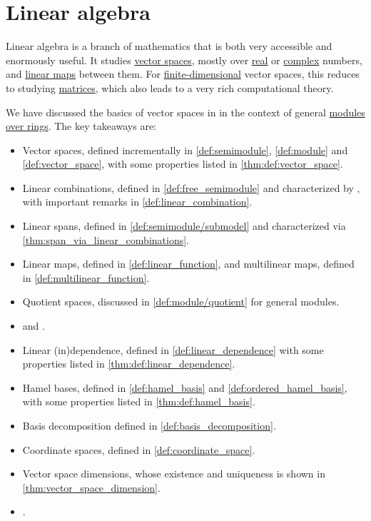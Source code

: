 \chapter{Linear algebra}\label{ch:linear_algebra}

Linear algebra is a branch of mathematics that is both very accessible and enormously useful. It studies \hyperref[def:vector_space]{vector spaces}, mostly over \hyperref[def:real_numbers]{real} or \hyperref[def:complex_numbers]{complex} numbers, and \hyperref[def:linear_function]{linear maps} between them. For \hyperref[thm:vector_space_dimension]{finite-dimensional} vector spaces, this reduces to studying \hyperref[def:array/matrix]{matrices}, which also leads to a very rich computational theory.

We have discussed the basics of vector spaces in  in the context of general \hyperref[def:module]{modules over rings}. The key takeaways are:
\begin{itemize}
  \item Vector spaces, defined incrementally in \cref{def:semimodule}, \cref{def:module} and \cref{def:vector_space}, with some properties listed in \cref{thm:def:vector_space}.
  \item Linear combinations, defined in \cref{def:free_semimodule} and characterized by , with important remarks in \cref{def:linear_combination}.
  \item Linear spans, defined in \cref{def:semimodule/submodel} and characterized via \cref{thm:span_via_linear_combinations}.
  \item Linear maps, defined in \cref{def:linear_function}, and multilinear maps, defined in \cref{def:multilinear_function}.
  \item Quotient spaces, discussed in \cref{def:module/quotient} for general modules.
  \item {} and .
  \item Linear (in)dependence, defined in \cref{def:linear_dependence} with some properties listed in \cref{thm:def:linear_dependence}.
  \item Hamel bases, defined in \cref{def:hamel_basis} and \cref{def:ordered_hamel_basis}, with some properties listed in \cref{thm:def:hamel_basis}.
  \item Basis decomposition defined in \cref{def:basis_decomposition}.
  \item Coordinate spaces, defined in \cref{def:coordinate_space}.
  \item Vector space dimensions, whose existence and uniqueness is shown in \cref{thm:vector_space_dimension}.
  \item {}.
\end{itemize}
